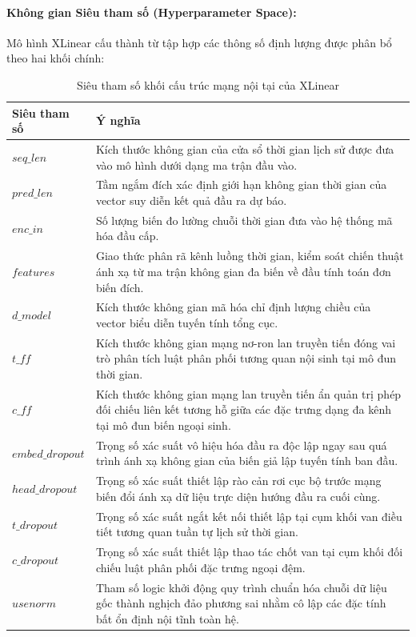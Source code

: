 \paragraph{Không gian Siêu tham số (Hyperparameter Space):}
Mô hình XLinear cấu thành từ tập hợp các thông số định lượng được phân bổ theo hai khối chính:

\begin{table}[htbp]
\centering
\caption{Siêu tham số khối cấu trúc mạng nội tại của XLinear}
\label{tab:xlinear_structure}
\renewcommand{\arraystretch}{1.3}
\begin{tabular}{p{3.8cm} p{10.5cm}}
\toprule
\textbf{Siêu tham số} & \textbf{Ý nghĩa} \\
\midrule
$seq\_len$ & Kích thước không gian của cửa sổ thời gian lịch sử được đưa vào mô hình dưới dạng ma trận đầu vào. \\
$pred\_len$ & Tầm ngắm đích xác định giới hạn không gian thời gian của vector suy diễn kết quả đầu ra dự báo. \\
$enc\_in$ & Số lượng biến đo lường chuỗi thời gian đưa vào hệ thống mã hóa đầu cấp. \\
$features$ & Giao thức phân rã kênh luồng thời gian, kiểm soát chiến thuật ánh xạ từ ma trận không gian đa biến về đầu tính toán đơn biến đích. \\
$d\_model$ & Kích thước không gian mã hóa chỉ định lượng chiều của vector biểu diễn tuyến tính tổng cục. \\
$t\_ff$ & Kích thước không gian mạng nơ-ron lan truyền tiến đóng vai trò phân tích luật phân phối tương quan nội sinh tại mô đun thời gian. \\
$c\_ff$ & Kích thước không gian mạng lan truyền tiến ẩn quản trị phép đối chiếu liên kết tương hỗ giữa các đặc trưng dạng đa kênh tại mô đun biến ngoại sinh. \\
$embed\_dropout$ & Trọng số xác suất vô hiệu hóa đầu ra độc lập ngay sau quá trình ánh xạ không gian của biến giả lập tuyến tính ban đầu. \\
$head\_dropout$ & Trọng số xác suất thiết lập rào cản rơi cục bộ trước mạng biến đổi ánh xạ dữ liệu trực diện hướng đầu ra cuối cùng. \\
$t\_dropout$ & Trọng số xác suất ngắt kết nối thiết lập tại cụm khối van điều tiết tương quan tuần tự lịch sử thời gian. \\
$c\_dropout$ & Trọng số xác suất thiết lập thao tác chốt van tại cụm khối đối chiếu luật phân phối đặc trưng ngoại đệm. \\
$usenorm$ & Tham số logic khởi động quy trình chuẩn hóa chuỗi dữ liệu gốc thành nghịch đảo phương sai nhằm cô lập các đặc tính bất ổn định nội tĩnh toàn hệ. \\
\bottomrule
\end{tabular}
\end{table}

